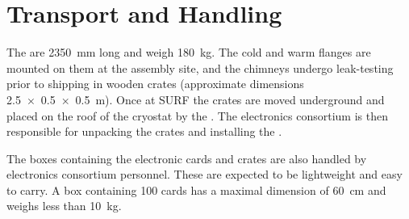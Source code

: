 \section{Transport and Handling}
\label{sec:dp-tpcelec-transport}

The  are \SI{2350}{\mm} long and weigh \SI{180}{\kg}.  The cold and warm flanges are mounted on them at the assembly site, and the chimneys undergo leak-testing prior to shipping in wooden crates (approximate dimensions \SI[product-units=power]{2.5x0.5x0.5}{m}). Once at SURF the crates are moved underground and placed on the roof of the cryostat by the . The \dual electronics consortium is then responsible for unpacking the crates and installing the . 

The boxes containing the electronic cards and  crates are also handled by \dual electronics consortium personnel. These are expected to be lightweight and easy to carry. A box containing \num{100}  cards has a maximal dimension of \SI{60}{\cm} and weighs less than \SI{10}{\kg}. 

